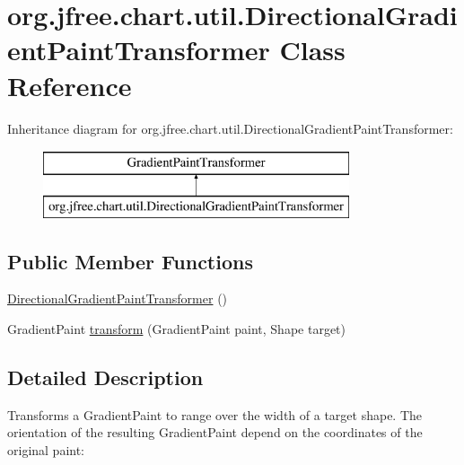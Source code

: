 \hypertarget{classorg_1_1jfree_1_1chart_1_1util_1_1_directional_gradient_paint_transformer}{}\section{org.\+jfree.\+chart.\+util.\+Directional\+Gradient\+Paint\+Transformer Class Reference}
\label{classorg_1_1jfree_1_1chart_1_1util_1_1_directional_gradient_paint_transformer}
Inheritance diagram for org.\+jfree.\+chart.\+util.\+Directional\+Gradient\+Paint\+Transformer\+:\begin{figure}[H]
\begin{center}
\leavevmode
\includegraphics[height=2.000000cm]{classorg_1_1jfree_1_1chart_1_1util_1_1_directional_gradient_paint_transformer}
\end{center}
\end{figure}
\subsection*{Public Member Functions}
\begin{DoxyCompactItemize}
\item 
\mbox{\hyperlink{classorg_1_1jfree_1_1chart_1_1util_1_1_directional_gradient_paint_transformer_a106ce54a958807e30e1b7ccba4685d8f}{Directional\+Gradient\+Paint\+Transformer}} ()
\item 
Gradient\+Paint \mbox{\hyperlink{classorg_1_1jfree_1_1chart_1_1util_1_1_directional_gradient_paint_transformer_ae4c496333f96b718c47e8e7a9e65cd44}{transform}} (Gradient\+Paint paint, Shape target)
\end{DoxyCompactItemize}


\subsection{Detailed Description}
Transforms a {\ttfamily Gradient\+Paint} to range over the width of a target shape. The orientation of the resulting {\ttfamily Gradient\+Paint} depend on the coordinates of the original paint\+:


